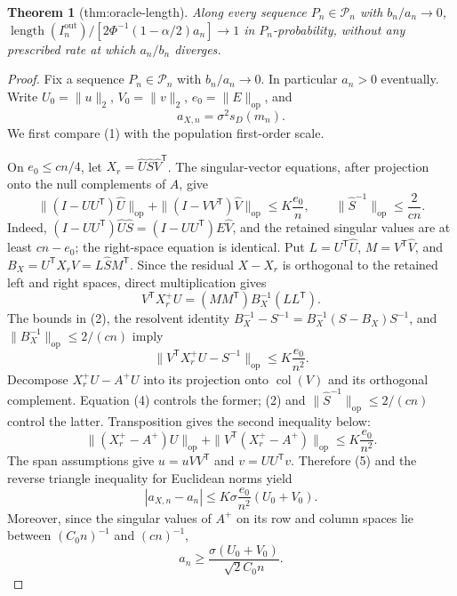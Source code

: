 \documentclass{article}
\newtheorem{theorem}{Theorem}
\begin{document}
\begin{theorem}[thm:oracle-length]\label{thm:oracle-length}
Along every sequence \(P_n\in\mathcal P_n\) with \(b_n/a_n\to0\), \(\operatorname{length}(I_n^{\mathrm{out}})/[2\Phi^{-1}(1-\alpha/2)a_n]\to1\) in \(P_n\)-probability, without any prescribed rate at which \(a_n/b_n\) diverges.
\end{theorem}
\begin{proof}
Fix a sequence \(P_n\in\mathcal P_n\) with \(b_n/a_n\to0\).  In particular \(a_n>0\) eventually.  Write \(U_0=\|u\|_2\), \(V_0=\|v\|_2\), \(e_0=\|E\|_{\mathrm{op}}\), and
\[
a_{X,n}=\sigma^2s_D(m_n).
\tag{1}
\]
We first compare (1) with the population first-order scale.

On \(e_0\le cn/4\), let \(X_r=\widehat U\widehat S\widehat V^{\mathsf T}\).  The singular-vector equations, after projection onto the null complements of \(A\), give
\[
\|(I-UU^{\mathsf T})\widehat U\|_{\mathrm{op}}
+\|(I-VV^{\mathsf T})\widehat V\|_{\mathrm{op}}
\le K\frac{e_0}{n},
\qquad
\|\widehat S^{-1}\|_{\mathrm{op}}\le\frac{2}{cn}.
\tag{2}
\]
Indeed, \((I-UU^{\mathsf T})\widehat U\widehat S=(I-UU^{\mathsf T})E\widehat V\), and the retained singular values are at least \(cn-e_0\); the right-space equation is identical.  Put \(L=U^{\mathsf T}\widehat U\), \(M=V^{\mathsf T}\widehat V\), and \(B_X=U^{\mathsf T}X_rV=L\widehat S M^{\mathsf T}\).  Since the residual \(X-X_r\) is orthogonal to the retained left and right spaces, direct multiplication gives
\[
V^{\mathsf T}X_r^+U=(MM^{\mathsf T})B_X^{-1}(LL^{\mathsf T}).
\tag{3}
\]
The bounds in (2), the resolvent identity \(B_X^{-1}-S^{-1}=B_X^{-1}(S-B_X)S^{-1}\), and \(\|B_X^{-1}\|_{\mathrm{op}}\le2/(cn)\) imply
\[
\|V^{\mathsf T}X_r^+U-S^{-1}\|_{\mathrm{op}}
\le K\frac{e_0}{n^2}.
\tag{4}
\]
Decompose \(X_r^+U-A^+U\) into its projection onto \(\operatorname{col}(V)\) and its orthogonal complement.  Equation (4) controls the former; (2) and \(\|\widehat S^{-1}\|_{\mathrm{op}}\le2/(cn)\) control the latter.  Transposition gives the second inequality below:
\[
\|(X_r^+-A^+)U\|_{\mathrm{op}}
+\|V^{\mathsf T}(X_r^+-A^+)\|_{\mathrm{op}}
\le K\frac{e_0}{n^2}.
\tag{5}
\]
The span assumptions give \(u=uVV^{\mathsf T}\) and \(v=UU^{\mathsf T}v\).  Therefore (5) and the reverse triangle inequality for Euclidean norms yield
\[
|a_{X,n}-a_n|
\le K\sigma\frac{e_0}{n^2}(U_0+V_0).
\tag{6}
\]
Moreover, since the singular values of \(A^+\) on its row and column spaces lie between \((C_0n)^{-1}\) and \((cn)^{-1}\),
\[
a_n\ge\frac{\sigma(U_0+V_0)}{\sqrt2C_0n}.
\tag{7}
\]


\end{proof}
\end{document}

